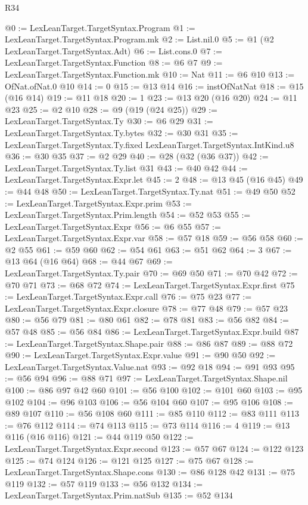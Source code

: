 \begin{lexlean}{R34}
\begin{coremodule}
@0 := LexLeanTarget.TargetSyntax.Program
@1 := LexLeanTarget.TargetSyntax.Program.mk
@2 := List.nil.{0}
@5 := @1 (@2 LexLeanTarget.TargetSyntax.Adt)
@6 := List.cons.{0}
@7 := LexLeanTarget.TargetSyntax.Function
@8 := @6 @7
@9 := LexLeanTarget.TargetSyntax.Function.mk
@10 := Nat
@11 := @6 @10
@13 := OfNat.ofNat.{0} @10
@14 := 0
@15 := @13 @14
@16 := instOfNatNat
@18 := @15 (@16 @14)
@19 := @11 @18
@20 := 1
@23 := @13 @20 (@16 @20)
@24 := @11 @23
@25 := @2 @10
@28 := @9 (@19 (@24 @25))
@29 := LexLeanTarget.TargetSyntax.Ty
@30 := @6 @29
@31 := LexLeanTarget.TargetSyntax.Ty.bytes
@32 := @30 @31
@35 := LexLeanTarget.TargetSyntax.Ty.fixed LexLeanTarget.TargetSyntax.IntKind.u8
@36 := @30 @35
@37 := @2 @29
@40 := @28 (@32 (@36 @37))
@42 := LexLeanTarget.TargetSyntax.Ty.list @31
@43 := @40 @42
@44 := LexLeanTarget.TargetSyntax.Expr.let
@45 := 2
@48 := @13 @45 (@16 @45)
@49 := @44 @48
@50 := LexLeanTarget.TargetSyntax.Ty.nat
@51 := @49 @50
@52 := LexLeanTarget.TargetSyntax.Expr.prim
@53 := LexLeanTarget.TargetSyntax.Prim.length
@54 := @52 @53
@55 := LexLeanTarget.TargetSyntax.Expr
@56 := @6 @55
@57 := LexLeanTarget.TargetSyntax.Expr.var
@58 := @57 @18
@59 := @56 @58
@60 := @2 @55
@61 := @59 @60
@62 := @54 @61
@63 := @51 @62
@64 := 3
@67 := @13 @64 (@16 @64)
@68 := @44 @67
@69 := LexLeanTarget.TargetSyntax.Ty.pair
@70 := @69 @50
@71 := @70 @42
@72 := @70 @71
@73 := @68 @72
@74 := LexLeanTarget.TargetSyntax.Expr.first
@75 := LexLeanTarget.TargetSyntax.Expr.call
@76 := @75 @23
@77 := LexLeanTarget.TargetSyntax.Expr.closure
@78 := @77 @48
@79 := @57 @23
@80 := @56 @79
@81 := @80 @61
@82 := @78 @81
@83 := @56 @82
@84 := @57 @48
@85 := @56 @84
@86 := LexLeanTarget.TargetSyntax.Expr.build
@87 := LexLeanTarget.TargetSyntax.Shape.pair
@88 := @86 @87
@89 := @88 @72
@90 := LexLeanTarget.TargetSyntax.Expr.value
@91 := @90 @50
@92 := LexLeanTarget.TargetSyntax.Value.nat
@93 := @92 @18
@94 := @91 @93
@95 := @56 @94
@96 := @88 @71
@97 := LexLeanTarget.TargetSyntax.Shape.nil
@100 := @86 @97 @42 @60
@101 := @56 @100
@102 := @101 @60
@103 := @95 @102
@104 := @96 @103
@106 := @56 @104 @60
@107 := @95 @106
@108 := @89 @107
@110 := @56 @108 @60
@111 := @85 @110
@112 := @83 @111
@113 := @76 @112
@114 := @74 @113
@115 := @73 @114
@116 := 4
@119 := @13 @116 (@16 @116)
@121 := @44 @119 @50
@122 := LexLeanTarget.TargetSyntax.Expr.second
@123 := @57 @67
@124 := @122 @123
@125 := @74 @124
@126 := @121 @125
@127 := @75 @67
@128 := LexLeanTarget.TargetSyntax.Shape.cons
@130 := @86 @128 @42
@131 := @75 @119
@132 := @57 @119
@133 := @56 @132
@134 := LexLeanTarget.TargetSyntax.Prim.natSub
@135 := @52 @134

\end{coremodule}
\end{lexlean}
